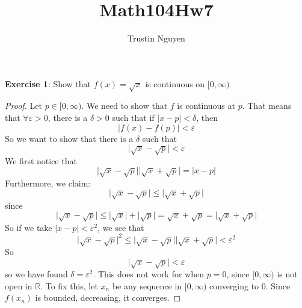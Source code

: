 \documentclass{article}
\title{Math104Hw7}
\author{Trustin Nguyen}
\begin{document}
    \maketitle

\reversemarginpar

\textbf{Exercise 1}: Show that $f(x) = \sqrt{x}$ is continuous on $[0, \infty )$
    \begin{proof}
        Let $p \in [0, \infty )$. We need to show that $f$ is continuous at $p$. That means that $\forall \varepsilon> 0$, there is a $\delta > 0$ such that if $\lvert x - p \rvert < \delta$, then
            \begin{equation*}
                \lvert f(x) - f(p) \rvert < \varepsilon
            \end{equation*}
        So we want to show that there is a $\delta$ such that
            \begin{equation*}
                \lvert \sqrt{x} - \sqrt{p} \rvert < \varepsilon
            \end{equation*}
        We first notice that
            \begin{equation*}
                \lvert \sqrt{x} - \sqrt{p} \rvert \lvert \sqrt{x} + \sqrt{p} \rvert = \lvert x - p \rvert
            \end{equation*}
        Furthermore, we claim:
            \begin{equation*}
                \lvert \sqrt{x} - \sqrt{p} \rvert \leq \lvert \sqrt{x} + \sqrt{p} \rvert
            \end{equation*}
        since
            \begin{equation*}
                \lvert \sqrt{x} - \sqrt{p} \rvert \leq \lvert \sqrt{x} \rvert + \lvert \sqrt{p} \rvert = \sqrt{x} + \sqrt{p} = \lvert \sqrt{x} + \sqrt{p} \rvert
            \end{equation*}
        So if we take $\lvert x - p \rvert < \varepsilon^{2}$, we see that
            \begin{equation*}
                \lvert \sqrt{x} - \sqrt{p} \rvert^{2} \leq \lvert \sqrt{x} - \sqrt{p} \rvert \lvert \sqrt{x} + \sqrt{p} \rvert < \varepsilon^{2}
            \end{equation*}
        So
            \begin{equation*}
                \lvert \sqrt{x} - \sqrt{p} \rvert < \varepsilon
            \end{equation*}
        so we have found $\delta = \varepsilon^{2}$. This does not work for when $p = 0$, since $[0, \infty )$ is not open in $\mathbb{R}$. To fix this, let $x_{n}$ be any sequence in $[0, \infty )$ converging to $0$. Since $f(x_{n})$ is bounded, decreasing, it converges.
     \end{proof}
\end{document}
